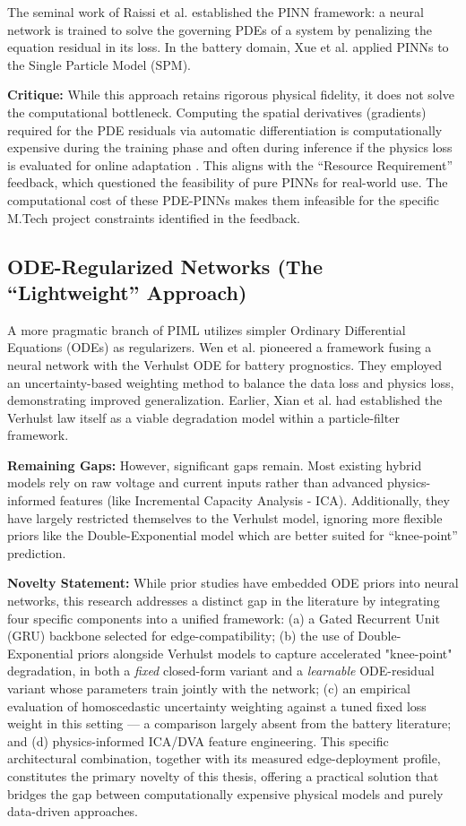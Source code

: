 The seminal work of Raissi et al. \cite{raissi_pinn} established the PINN framework: a neural network is trained to solve the governing PDEs of a system by penalizing the equation residual in its loss. In the battery domain, Xue et al. \cite{wang_pinn} applied PINNs to the Single Particle Model (SPM).

\textbf{Critique:} While this approach retains rigorous physical fidelity, it does not solve the computational bottleneck. Computing the spatial derivatives (gradients) required for the PDE residuals via automatic differentiation is computationally expensive during the training phase and often during inference if the physics loss is evaluated for online adaptation \cite{pine_survey}. This aligns with the ``Resource Requirement'' feedback, which questioned the feasibility of pure PINNs for real-world use. The computational cost of these PDE-PINNs makes them infeasible for the specific M.Tech project constraints identified in the feedback.

\subsection{ODE-Regularized Networks (The ``Lightweight'' Approach)}

A more pragmatic branch of PIML utilizes simpler Ordinary Differential Equations (ODEs) as regularizers. Wen et al. \cite{pde_pinn} pioneered a framework fusing a neural network with the Verhulst ODE for battery prognostics. They employed an uncertainty-based weighting method to balance the data loss and physics loss, demonstrating improved generalization. Earlier, Xian et al. \cite{verhulst_pso} had established the Verhulst law itself as a viable degradation model within a particle-filter framework.

\textbf{Remaining Gaps:} However, significant gaps remain. Most existing hybrid models rely on raw voltage and current inputs rather than advanced physics-informed features (like Incremental Capacity Analysis - ICA). Additionally, they have largely restricted themselves to the Verhulst model, ignoring more flexible priors like the Double-Exponential model which are better suited for ``knee-point'' prediction.

\textbf{Novelty Statement:} While prior studies have embedded ODE priors into neural networks, this research addresses a distinct gap in the literature by integrating four specific components into a unified framework: (a) a Gated Recurrent Unit (GRU) backbone selected for edge-compatibility; (b) the use of Double-Exponential priors alongside Verhulst models to capture accelerated "knee-point" degradation, in both a \emph{fixed} closed-form variant and a \emph{learnable} ODE-residual variant whose parameters train jointly with the network; (c) an empirical evaluation of homoscedastic uncertainty weighting against a tuned fixed loss weight in this setting --- a comparison largely absent from the battery literature; and (d) physics-informed ICA/DVA feature engineering. This specific architectural combination, together with its measured edge-deployment profile, constitutes the primary novelty of this thesis, offering a practical solution that bridges the gap between computationally expensive physical models and purely data-driven approaches.
